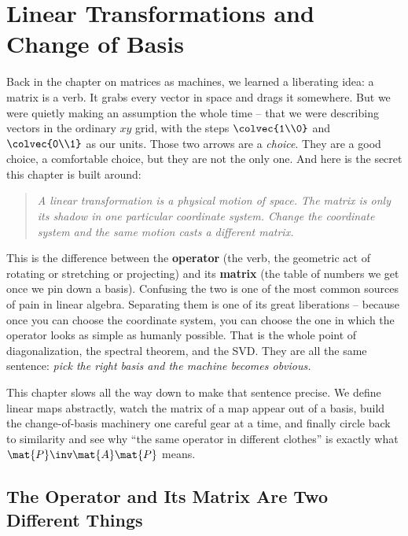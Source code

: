 \chapter{Linear Transformations and Change of Basis}

Back in the chapter on matrices as machines, we learned a liberating idea: a
matrix is a verb. It grabs every vector in space and drags it somewhere. But we
were quietly making an assumption the whole time -- that we were describing
vectors in the ordinary $xy$ grid, with the steps $\colvec{1\\0}$ and
$\colvec{0\\1}$ as our units. Those two arrows are a \emph{choice}. They are a
good choice, a comfortable choice, but they are not the only one. And here is the
secret this chapter is built around:

\begin{quote}
\emph{A linear transformation is a physical motion of space. The matrix is only
its shadow in one particular coordinate system. Change the coordinate system and
the same motion casts a different matrix.}
\end{quote}

This is the difference between the \textbf{operator} (the verb, the geometric
act of rotating or stretching or projecting) and its \textbf{matrix} (the table
of numbers we get once we pin down a basis). Confusing the two is one of the most
common sources of pain in linear algebra. Separating them is one of its great
liberations -- because once you can choose the coordinate system, you can choose
the one in which the operator looks as simple as humanly possible. That is the
whole point of diagonalization, the spectral theorem, and the SVD. They are all
the same sentence: \emph{pick the right basis and the machine becomes obvious.}

This chapter slows all the way down to make that sentence precise. We define
linear maps abstractly, watch the matrix of a map appear out of a basis, build
the change-of-basis machinery one careful gear at a time, and finally circle back
to similarity and see why ``the same operator in different clothes'' is exactly
what $\mat{P}\inv \mat{A}\mat{P}$ means.

\section{The Operator and Its Matrix Are Two Different Things}
\label{ch31:operator-vs-matrix}

